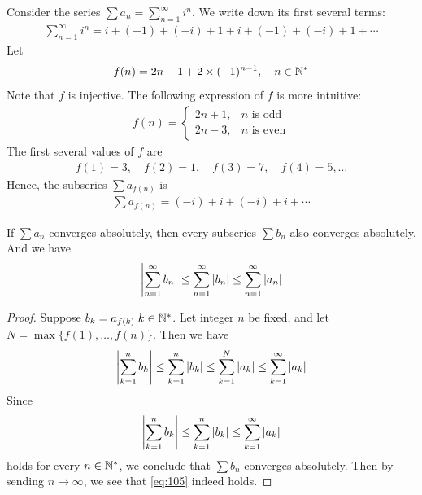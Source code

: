 \documentclass[thmcnt=section, 12pt]{my-elegantbook}
\begin{document}
\begin{example}
    Consider the series $\sum a_n = \sum_{n=1}^\infty i^n$. We write down its first several terms:
    \begin{align*}
        \sum_{n=1}^\infty i^n
        = i + (-1) + (-i) + 1
        + i + (-1) + (-i) + 1 + \cdots
    \end{align*}
    Let
    \begin{align*}
        f(n) = 2n - 1 + 2 \times (-1)^{n-1},
        \quad n \in \mathbb{N}^\ast
    \end{align*}
    Note that $f$ is injective. The following expression of $f$ is more intuitive:
    \begin{align*}
        f(n) = \begin{cases}
                   2n + 1,
                    & \text{$n$ is odd}  \\
                   2n - 3,
                    & \text{$n$ is even}
               \end{cases}
    \end{align*}
    The first several values of $f$ are
    \begin{align*}
        f(1) = 3,
        \quad
        f(2) = 1,
        \quad
        f(3) = 7,
        \quad
        f(4) = 5,
        \ldots
    \end{align*}
    Hence, the subseries $\sum a_{f(n)}$ is
    \begin{align*}
        \sum a_{f(n)} = (-i) + i + (-i) + i + \cdots
    \end{align*}
\end{example}


\begin{theorem} \label{thm:49}
    If $\sum a_n$ converges absolutely, then every subseries $\sum b_n$ also converges absolutely. And we have
    \begin{align}
        \left\lvert \sum_{n=1}^\infty b_n \right\rvert
        \leq \sum_{n=1}^\infty \left\lvert b_n \right\rvert
        \leq \sum_{n=1}^\infty \left\lvert a_n \right\rvert
        \label{eq:105}
    \end{align}
\end{theorem}

\begin{proof}
    Suppose $b_k = a_{f(k)} \; k \in \mathbb{N}^\ast$. Let integer $n$ be fixed, and let $N = \max \{ f(1), \ldots, f(n) \}$. Then we have
    \begin{align*}
        \left\lvert \sum_{k=1}^n b_k \right\rvert
        \leq \sum_{k=1}^n \left\lvert b_k \right\rvert
        \leq \sum_{k=1}^N \left\lvert a_k \right\rvert
        \leq \sum_{k=1}^\infty \left\lvert a_k \right\rvert
    \end{align*}
    Since
    \begin{align*}
        \left\lvert \sum_{k=1}^n b_k \right\rvert
        \leq \sum_{k=1}^n \left\lvert b_k \right\rvert
        \leq \sum_{k=1}^\infty \left\lvert a_k \right\rvert
    \end{align*}
    holds for every $n \in \mathbb{N}^\ast$, we conclude that $\sum b_n$ converges absolutely. Then by sending $n \to \infty$, we see that \eqref{eq:105} indeed holds.
\end{proof}
\end{document}
